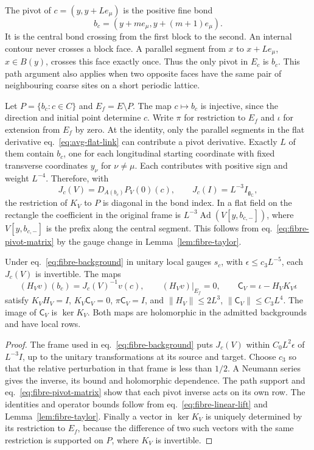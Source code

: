 \documentclass[11pt,letterpaper,reqno]{amsart}
\makeatletter
\numberwithin{equation}{section}
\renewcommand{\eqref}[1]{\textup{eq.~\ref{#1}}}
\theoremstyle{definition}
\newcommand{\ms@minorstart}{%
  \pushQED{\qed}\renewcommand{\qedsymbol}{$\blacksquare$}}
\newenvironment{lemma}[1][]{\ms@minorstart\ms@lemma[#1]}
  {\popQED\endms@lemma}
\theoremstyle{remark}
\makeatother
\begin{document}
The pivot of $c=(y,y+Le_\mu)$ is the positive fine bond
\[
 b_c=(y+me_\mu,y+(m+1)e_\mu).
\]
It is the central bond crossing from the first block to the second. An
internal contour never crosses a block face. A parallel segment from $x$ to
$x+Le_\mu$, $x\in B(y)$, crosses this face exactly once. Thus the only pivot
in $E_c$ is $b_c$. This path argument also applies when two opposite faces
have the same pair of neighbouring coarse sites on a short periodic lattice.

Let $P=\{b_c:c\in C\}$ and $E_f=E\setminus P$. The map $c\mapsto b_c$ is
injective, since the direction and initial point determine $c$. Write $\pi$
for restriction to $E_f$ and $\iota$ for extension from $E_f$ by zero. At the
identity, only the parallel segments in the flat derivative
\eqref{eq:avg-flat-link} can contribute a pivot derivative. Exactly $L$ of
them contain $b_c$, one for each longitudinal starting coordinate with fixed
transverse coordinates $y_\nu$ for $\nu\ne\mu$. Each contributes with positive
sign and weight $L^{-4}$. Therefore, with
\begin{equation}\label{eq:fibre-pivot-matrix}
 J_c(V)=D_{A(b_c)}P_V(0)(c),\qquad J_c(I)=L^{-3}I_{\mathfrak g_\mathbb C},
\end{equation}
the restriction of $K_V$ to $P$ is diagonal in the bond index. In a flat field
on the rectangle the coefficient in the original frame is
$L^{-3}\operatorname{Ad}(V[y,b_{c,-}])$, where $V[y,b_{c,-}]$ is the prefix
along the central segment. This follows from \eqref{eq:fibre-pivot-matrix} by
the gauge change in Lemma~\ref{lem:fibre-taylor}.

\begin{lemma}[Right inverse on the pivots]\label{lem:fibre-pivot}
Under \eqref{eq:fibre-background} in unitary local gauges
\(s_c\), with $\epsilon\le c_3L^{-5}$, each $J_c(V)$
is invertible. The maps
\begin{equation}\label{eq:fibre-linear-lift}
 (H_V v)(b_c)=J_c(V)^{-1}v(c),\qquad
 (H_V v)|_{E_f}=0,\qquad \mathsf C_V=\iota-H_VK_V\iota
\end{equation}
satisfy $K_VH_V=I$, $K_V\mathsf C_V=0$, $\pi\mathsf C_V=I$, and
$\|H_V\|\le2L^3$, $\|\mathsf C_V\|\le C_3L^4$. The image of $\mathsf C_V$ is
$\ker K_V$. Both maps are holomorphic in the admitted backgrounds and have
local rows.
\end{lemma}

\begin{proof}
The frame used in \eqref{eq:fibre-background} puts $J_c(V)$ within
$C_0L^2\epsilon$ of $L^{-3}I$, up to the unitary transformations at its source
and target. Choose $c_3$ so that the relative perturbation in that frame is
less than $1/2$. A Neumann series gives the inverse, its bound and holomorphic
dependence. The path support and \eqref{eq:fibre-pivot-matrix} show that each
pivot inverse acts on its own row. The identities and operator bounds follow
from \eqref{eq:fibre-linear-lift} and Lemma~\ref{lem:fibre-taylor}. Finally a
vector in $\ker K_V$ is uniquely determined by its restriction to $E_f$,
because the difference of two such vectors with the same restriction is
supported on $P$, where $K_V$ is invertible.
\end{proof}
\end{document}
